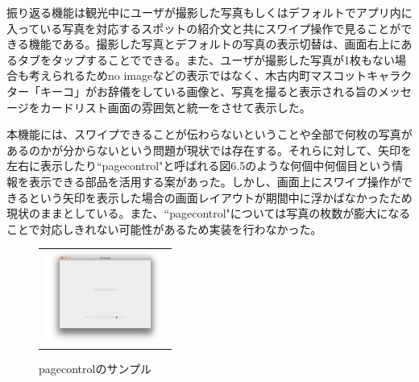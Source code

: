 振り返る機能は観光中にユーザが撮影した写真もしくはデフォルトでアプリ内に入っている写真を対応するスポットの紹介文と共にスワイプ操作で見ることができる機能である。撮影した写真とデフォルトの写真の表示切替は、画面右上にあるタブをタップすることでできる。また、ユーザが撮影した写真が1枚もない場合も考えられるためno imageなどの表示ではなく、木古内町マスコットキャラクター「キーコ」がお辞儀をしている画像と、写真を撮ると表示される旨のメッセージをカードリスト画面の雰囲気と統一をさせて表示した。\par
本機能には、スワイプできることが伝わらないということや全部で何枚の写真があるのかが分からないという問題が現状では存在する。それらに対して、矢印を左右に表示したり``pagecontrol"と呼ばれる図6.5のような何個中何個目という情報を表示できる部品を活用する案があった。しかし、画面上にスワイプ操作ができるという矢印を表示した場合の画面レイアウトが期間中に浮かばなかったため現状のままとしている。また、``pagecontrol"については写真の枚数が膨大になることで対応しきれない可能性があるため実装を行わなかった。

\newpage

\begin{figure}[htbp]
  \begin{center}
    \begin{tabular}{c}

      \begin{minipage}{0.33\hsize}
        \begin{center}
\includegraphics[width=4cm, bb=0 0 640 480]{pagecontrol.png}
        \end{center}
      \end{minipage}

    \end{tabular}
    \caption{pagecontrolのサンプル}
    \label{fig:lena}
  \end{center}
\end{figure}

